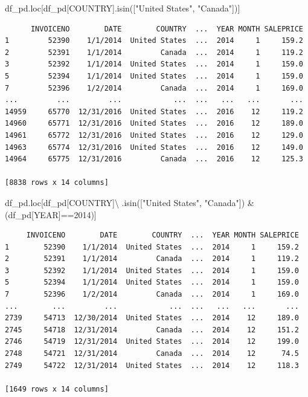 \documentclass[
  letterpaper,
  DIV=11,
  numbers=noendperiod]{scrreprt}
\newenvironment{Shaded}{\begin{snugshade}}{\end{snugshade}}
\newcommand{\DecValTok}[1]{\textcolor[rgb]{0.68,0.00,0.00}{#1}}
\newcommand{\NormalTok}[1]{\textcolor[rgb]{0.00,0.23,0.31}{#1}}
\newcommand{\OperatorTok}[1]{\textcolor[rgb]{0.37,0.37,0.37}{#1}}
\newcommand{\StringTok}[1]{\textcolor[rgb]{0.13,0.47,0.30}{#1}}
\begin{document}
\begin{Shaded}
\begin{Highlighting}[]
\NormalTok{df\_pd.loc[df\_pd[}\StringTok{\textquotesingle{}COUNTRY\textquotesingle{}}\NormalTok{].isin([}\StringTok{"United States"}\NormalTok{, }\StringTok{"Canada"}\NormalTok{])]}
\end{Highlighting}
\end{Shaded}

\begin{verbatim}
      INVOICENO        DATE        COUNTRY  ...  YEAR MONTH SALEPRICE
1         52390    1/1/2014  United States  ...  2014     1     159.2
2         52391    1/1/2014         Canada  ...  2014     1     119.2
3         52392    1/1/2014  United States  ...  2014     1     159.0
5         52394    1/1/2014  United States  ...  2014     1     159.0
7         52396    1/2/2014         Canada  ...  2014     1     169.0
...         ...         ...            ...  ...   ...   ...       ...
14959     65770  12/31/2016  United States  ...  2016    12     119.2
14960     65771  12/31/2016  United States  ...  2016    12     189.0
14961     65772  12/31/2016  United States  ...  2016    12     129.0
14963     65774  12/31/2016  United States  ...  2016    12     149.0
14964     65775  12/31/2016         Canada  ...  2016    12     125.3

[8838 rows x 14 columns]
\end{verbatim}

\begin{Shaded}
\begin{Highlighting}[]
\NormalTok{df\_pd.loc[df\_pd[}\StringTok{\textquotesingle{}COUNTRY\textquotesingle{}}\NormalTok{]}\OperatorTok{\textbackslash{}}
\NormalTok{ .isin([}\StringTok{"United States"}\NormalTok{, }\StringTok{"Canada"}\NormalTok{]) }\OperatorTok{\&}\NormalTok{(df\_pd[}\StringTok{\textquotesingle{}YEAR\textquotesingle{}}\NormalTok{]}\OperatorTok{==}\DecValTok{2014}\NormalTok{)]}
\end{Highlighting}
\end{Shaded}

\begin{verbatim}
     INVOICENO        DATE        COUNTRY  ...  YEAR MONTH SALEPRICE
1        52390    1/1/2014  United States  ...  2014     1     159.2
2        52391    1/1/2014         Canada  ...  2014     1     119.2
3        52392    1/1/2014  United States  ...  2014     1     159.0
5        52394    1/1/2014  United States  ...  2014     1     159.0
7        52396    1/2/2014         Canada  ...  2014     1     169.0
...        ...         ...            ...  ...   ...   ...       ...
2739     54713  12/30/2014  United States  ...  2014    12     189.0
2745     54718  12/31/2014         Canada  ...  2014    12     151.2
2746     54719  12/31/2014  United States  ...  2014    12     199.0
2748     54721  12/31/2014         Canada  ...  2014    12      74.5
2749     54722  12/31/2014  United States  ...  2014    12     118.3

[1649 rows x 14 columns]
\end{verbatim}
\end{document}
